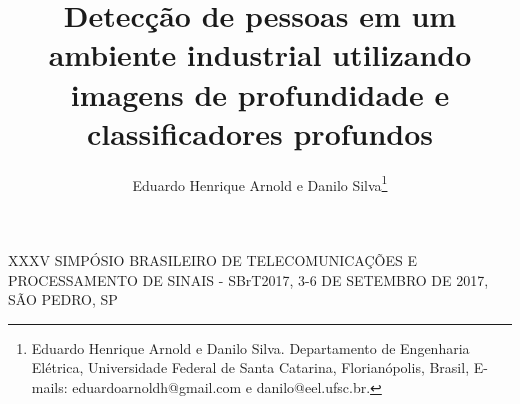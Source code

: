 \documentclass{sbrt2017port}
\begin{document}
\title{Detecção de pessoas em um ambiente industrial utilizando imagens de profundidade e classificadores profundos}

\author{Eduardo Henrique Arnold e Danilo Silva\thanks{Eduardo Henrique Arnold e Danilo Silva. Departamento de Engenharia Elétrica, Universidade Federal de Santa Catarina, Florianópolis, Brasil, E-mails: eduardoarnoldh@gmail.com e danilo@eel.ufsc.br. } }

\maketitle

 {XXXV SIMPÓSIO BRASILEIRO DE TELECOMUNICAÇÕES E PROCESSAMENTO DE SINAIS - SBrT2017, 3-6 DE SETEMBRO DE 2017, SÃO PEDRO, SP}



\nocite{*}


\end{document}
